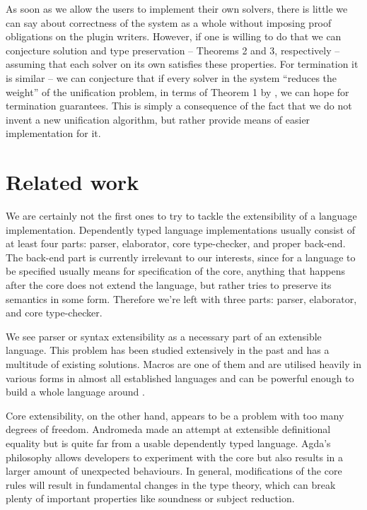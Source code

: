 \documentclass[
  sigconf,
  screen,
  review]{acmart}
\begin{document}
As soon as we allow the users to implement their own solvers, there is
little we can say about correctness of the system as a whole without
imposing proof obligations on the plugin writers. However, if one is
willing to do that we can conjecture solution and type preservation --
Theorems 2 and 3, respectively \citep{abelHigherOrderDynamicPattern2011}
-- assuming that each solver on its own satisfies these properties. For
termination it is similar -- we can conjecture that if every solver in
the system ``reduces the weight'' of the unification problem, in terms
of Theorem 1 by \citet{abelHigherOrderDynamicPattern2011}, we can hope
for termination guarantees. This is simply a consequence of the fact
that we do not invent a new unification algorithm, but rather provide
means of easier implementation for it.

\hypertarget{sec:related_work}{%
\section{Related work}\label{sec:related_work}}

We are certainly not the first ones to try to tackle the extensibility
of a language implementation. Dependently typed language implementations
usually consist of at least four parts: parser, elaborator, core
type-checker, and proper back-end. The back-end part is currently
irrelevant to our interests, since for a language to be specified
usually means for specification of the core, anything that happens after
the core does not extend the language, but rather tries to preserve its
semantics in some form. Therefore we're left with three parts: parser,
elaborator, and core type-checker.

We see parser or syntax extensibility as a necessary part of an
extensible language. This problem has been studied extensively in the
past and has a multitude of existing solutions. Macros are one of them
and are utilised heavily in various forms in almost all established
languages
\citep{thecoqdevelopmentteamCoqProofAssistant2022, theagdateamAgdaUserManual2023a, ullrichNotationsHygienicMacro2020}
and can be powerful enough to build a whole language around
\citep{changDependentTypeSystems2019}.

Core extensibility, on the other hand, appears to be a problem with too
many degrees of freedom. Andromeda
\citep{bauerDesignImplementationAndromeda2018, bauerEqualityCheckingGeneral2020}
made an attempt at extensible definitional equality but is quite far
from a usable dependently typed language. Agda's philosophy allows
developers to experiment with the core but also results in a larger
amount of unexpected behaviours. In general, modifications of the core
rules will result in fundamental changes in the type theory, which can
break plenty of important properties like soundness or subject
reduction.
\end{document}

